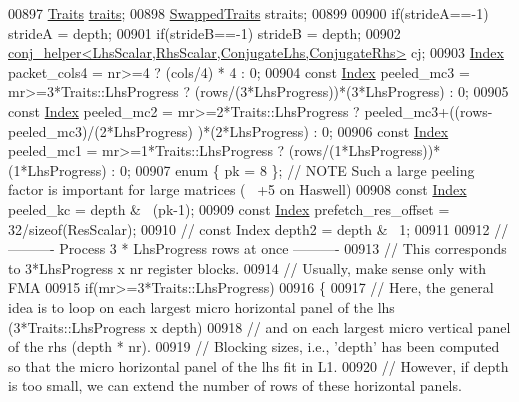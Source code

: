 \begin{DoxyCode}
00897     \hyperlink{class_eigen_1_1internal_1_1gebp__traits}{Traits} \hyperlink{struct_eigen_1_1internal_1_1traits}{traits};
00898     \hyperlink{class_eigen_1_1internal_1_1gebp__traits}{SwappedTraits} straits;
00899     
00900     \textcolor{keywordflow}{if}(strideA==-1) strideA = depth;
00901     \textcolor{keywordflow}{if}(strideB==-1) strideB = depth;
00902     \hyperlink{struct_eigen_1_1internal_1_1conj__helper}{conj\_helper<LhsScalar,RhsScalar,ConjugateLhs,ConjugateRhs>}
       cj;
00903     \hyperlink{namespace_eigen_a62e77e0933482dafde8fe197d9a2cfde}{Index} packet\_cols4 = nr>=4 ? (cols/4) * 4 : 0;
00904     \textcolor{keyword}{const} \hyperlink{namespace_eigen_a62e77e0933482dafde8fe197d9a2cfde}{Index} peeled\_mc3 = mr>=3*Traits::LhsProgress ? (rows/(3*LhsProgress))*(3*LhsProgress) : 0;
00905     \textcolor{keyword}{const} \hyperlink{namespace_eigen_a62e77e0933482dafde8fe197d9a2cfde}{Index} peeled\_mc2 = mr>=2*Traits::LhsProgress ? peeled\_mc3+((rows-peeled\_mc3)/(2*LhsProgress)
      )*(2*LhsProgress) : 0;
00906     \textcolor{keyword}{const} \hyperlink{namespace_eigen_a62e77e0933482dafde8fe197d9a2cfde}{Index} peeled\_mc1 = mr>=1*Traits::LhsProgress ? (rows/(1*LhsProgress))*(1*LhsProgress) : 0;
00907     \textcolor{keyword}{enum} \{ pk = 8 \}; \textcolor{comment}{// NOTE Such a large peeling factor is important for large matrices (~ +5%
       on Haswell)}
00908     \textcolor{keyword}{const} \hyperlink{namespace_eigen_a62e77e0933482dafde8fe197d9a2cfde}{Index} peeled\_kc  = depth & ~(pk-1);
00909     \textcolor{keyword}{const} \hyperlink{namespace_eigen_a62e77e0933482dafde8fe197d9a2cfde}{Index} prefetch\_res\_offset = 32/\textcolor{keyword}{sizeof}(ResScalar);    
00910 \textcolor{comment}{//     const Index depth2     = depth & ~1;}
00911 
00912     \textcolor{comment}{//---------- Process 3 * LhsProgress rows at once ----------}
00913     \textcolor{comment}{// This corresponds to 3*LhsProgress x nr register blocks.}
00914     \textcolor{comment}{// Usually, make sense only with FMA}
00915     \textcolor{keywordflow}{if}(mr>=3*Traits::LhsProgress)
00916     \{
00917       \textcolor{comment}{// Here, the general idea is to loop on each largest micro horizontal panel of the lhs
       (3*Traits::LhsProgress x depth)}
00918       \textcolor{comment}{// and on each largest micro vertical panel of the rhs (depth * nr).}
00919       \textcolor{comment}{// Blocking sizes, i.e., 'depth' has been computed so that the micro horizontal panel of the lhs fit
       in L1.}
00920       \textcolor{comment}{// However, if depth is too small, we can extend the number of rows of these horizontal panels.}

\end{DoxyCode}
